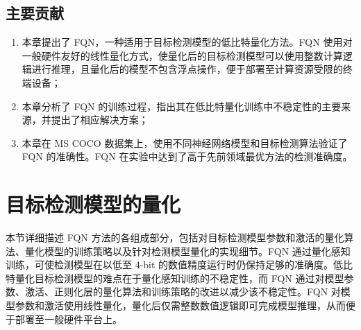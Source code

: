 \documentclass[
  fontset = mac,
]{shtthesis}
\begin{document}
\subsection{主要贡献}
\begin{enumerate}
  \item 本章提出了 FQN，一种适用于目标检测模型的低比特量化方法。FQN 使用对一般硬件友好的线性量化方式，使量化后的目标检测模型可以使用整数计算逻辑进行推理，且量化后的模型不包含浮点操作，便于部署至计算资源受限的终端设备；
  \item 本章分析了 FQN 的训练过程，指出其在低比特量化训练中不稳定性的主要来源，并提出了相应解决方案；
  \item 本章在 MS COCO 数据集上，使用不同神经网络模型和目标检测算法验证了 FQN 的准确性。FQN 在实验中达到了高于先前领域最优方法的检测准确度。
\end{enumerate}
\section{目标检测模型的量化} \label{sec::fqn::methods}
本节详细描述 FQN 方法的各组成部分，包括对目标检测模型参数和激活的量化算法、量化模型的训练策略以及针对检测模型量化的实现细节。FQN 通过量化感知训练，可使检测模型在以低至 4-bit 的数值精度运行时仍保持足够的准确度。低比特量化目标检测模型的难点在于量化感知训练的不稳定性，而 FQN 通过对模型参数、激活、正则化层的量化算法和训练策略的改进以减少该不稳定性。FQN 对模型参数和激活使用线性量化，量化后仅需整数数值逻辑即可完成模型推理，从而便于部署至一般硬件平台上。
\end{document}
